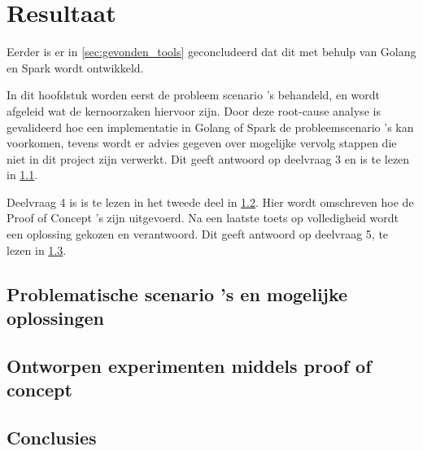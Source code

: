 \chapter{Resultaat}
\label{ch:resultaat}

Eerder is er in \ref{sec:gevonden_tools} geconcludeerd dat dit met behulp van Golang en Spark wordt ontwikkeld.

In dit hoofdstuk worden eerst de probleem scenario 's behandeld, en wordt afgeleid wat de kernoorzaken hiervoor zijn. Door deze root-cause analyse is gevalideerd hoe een implementatie in Golang of Spark de probleemscenario 's kan voorkomen, tevens wordt er advies gegeven over mogelijke vervolg stappen die niet in dit project zijn verwerkt. Dit geeft antwoord op deelvraag 3 en is te lezen in \ref{sec:deelvraag3}.

Deelvraag 4 is is te lezen in het tweede deel in \ref{sec:deelvraag4}. Hier wordt omschreven hoe de Proof of Concept ’s zijn uitgevoerd. Na een laatste toets op volledigheid wordt een oplossing gekozen en verantwoord. Dit geeft antwoord op deelvraag 5, te lezen in \ref{sec:deelvraag5}.
\clearpage

\section{Problematische scenario 's en mogelijke oplossingen}
\label{sec:deelvraag3}

\clearpage

\section{Ontworpen experimenten middels proof of concept}
\label{sec:deelvraag4}

\clearpage

\section{Conclusies}
\label{sec:deelvraag5}


